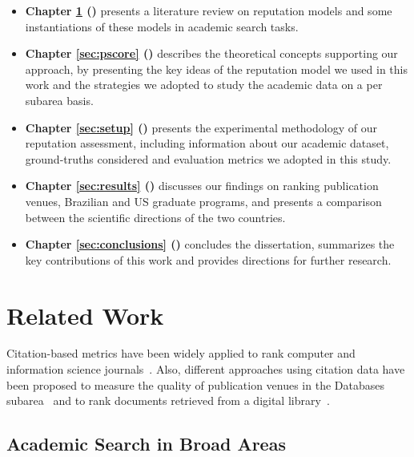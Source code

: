 \documentclass[msc]{ppgccufmg}
\begin{document}
\begin{itemize}
	\item \textbf{Chapter \ref{sec:related} ()}  presents a literature review on reputation models and some instantiations of these models in academic search tasks.
	\item \textbf{Chapter \ref{sec:pscore} ()} describes the theoretical concepts supporting our approach, by presenting the key ideas of the reputation model we used in this work and the strategies we adopted to study the academic data on a per subarea basis.
	\item \textbf{Chapter \ref{sec:setup} ()} presents the experimental methodology of our reputation assessment, including information about our academic dataset, ground-truths considered and evaluation metrics we adopted in this study.
	\item \textbf{Chapter \ref{sec:results} ()} discusses our findings on ranking publication venues, Brazilian and US graduate programs, and presents a comparison between the scientific directions of the two countries.
	\item \textbf{Chapter \ref{sec:conclusions} ()} concludes the dissertation, summarizes the key contributions of this work and provides directions for further research.
\end{itemize}


\chapter{Related Work}\label{sec:related}

Citation-based metrics have been widely applied to rank computer and information science journals~\citep{Katerattanakul2003,nerur2005assessing}. Also, different approaches using citation data have been proposed to measure the quality of publication venues in the Databases subarea~\citep{rahm2005citation} and to rank documents retrieved from a digital library~\citep{larsen2006using}. 

\section{Academic Search in Broad Areas} 
\end{document}
